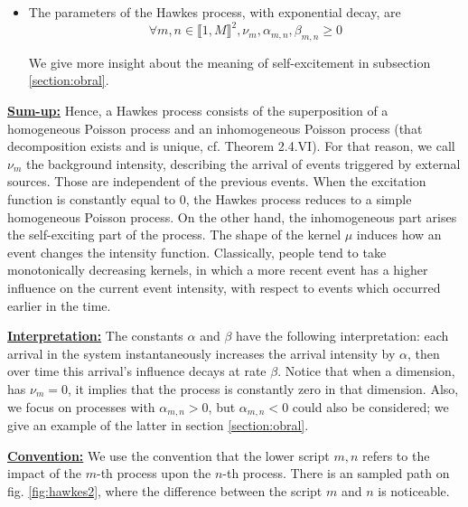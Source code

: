 \begin{definition}
\begin{itemize}
\item The parameters of the Hawkes process, with exponential decay, are $$ \forall m,n \in \llbracket 1, M \rrbracket^2, \nu_m, \alpha_{m,n}, \beta_{m,n} \geq 0$$


We give more insight about the meaning of self-excitement in subsection \ref{section:obral}.
\end{itemize}
\end{definition}

\underline{\textbf{Sum-up:}} Hence, a Hawkes process consists of the superposition of a homogeneous Poisson process and an inhomogeneous Poisson process (that decomposition exists and is unique, cf. \cite{daley} Theorem 2.4.VI). For that reason, we call $\nu_m$ the background intensity, describing the arrival of events triggered by external sources. Those are independent of the previous events. When the excitation function is constantly equal to $0$, the Hawkes process reduces to a simple homogeneous Poisson process. On the other hand, the inhomogeneous part arises the self-exciting part of the process. The shape of the kernel $\mu$ induces how an event changes the intensity function. Classically, people tend to take monotonically decreasing kernels, in which a more recent event has a higher influence on the current event intensity, with respect to events which occurred earlier in the time.

\vspace{0.5cm}

\underline{\textbf{Interpretation:}} The constants $\alpha$ and $\beta$ have the following interpretation: each arrival in the system instantaneously increases the arrival intensity by $\alpha$, then over time this arrival's influence decays at rate $\beta$.
Notice that when a dimension, has $\nu_m = 0$, it implies that the process is constantly zero in that dimension. Also, we focus on processes with $\alpha_{m,n} > 0$, but $\alpha_{m,n} < 0$ could also be considered; we give an example of the latter in section \ref{section:obral}. 

\vspace{0.5cm}

\underline{\textbf{Convention:}} We use the convention that the lower script $m,n$ refers to the impact of the $m$-th process upon the $n$-th process. There is an sampled path on fig. \ref{fig:hawkes2}, where the difference between the script $m$ and $n$ is noticeable.

\vspace{0.5cm}

